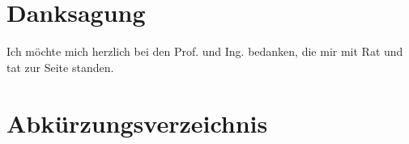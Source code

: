 \documentclass[
fontsize=12pt, 
paper=a4, 
BCOR=10mm, 
twoside=false,
 DIV=10, 
 headsepline, 
 footsepline
 ]{scrartcl}
\begin{document}
 


\pagebreak


\thispagestyle{empty}
\tableofcontents
\pagebreak


\section*{Danksagung}

\thispagestyle{empty}

Ich möchte mich herzlich bei den Prof. und Ing. bedanken, die mir mit Rat und tat zur Seite standen.

\pagebreak

\section*{Abkürzungsverzeichnis}
\thispagestyle{empty}




%
%
%

\end{document}
